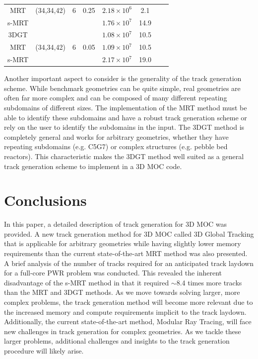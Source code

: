 \begin{table}[h]
\begin{tabular}{cccccccc}
		MRT   & (34,34,42) & 6  & 0.25 & $2.18 \times 10^{6}$ & 2.1 \\
		s-MRT &            &    &      & $1.76 \times 10^{7}$ & 14.9 \\ \hline
		3DGT  &            &    &      & $1.08 \times 10^{7}$ & 10.5 \\
		MRT   & (34,34,42) & 6  & 0.05 & $1.09 \times 10^{7}$ & 10.5 \\
		s-MRT &            &    &      & $2.17 \times 10^{7}$ & 19.0 \\
		\bottomrule
	\end{tabular}
	\label{tab:dom_dec_reqs}
\end{table}

Another important aspect to consider is the generality of the track generation scheme. While benchmark geometries can be quite simple, real geometries are often far more complex and can be composed of many different repeating subdomains of different sizes. The implementation of the MRT method must be able to identify these subdomains and have a robust track generation scheme or rely on the user to identify the subdomains in the input. The 3DGT method is completely general and works for arbitrary geometries, whether they have repeating subdomains (e.g. C5G7) or complex structures (e.g. pebble bed reactors). This characteristic makes the 3DGT method well suited as a general track generation scheme to implement in a 3D MOC code.

\section{Conclusions}

In this paper, a detailed description of track generation for 3D MOC was provided. A new track generation method for 3D MOC called 3D Global Tracking that is applicable for arbitrary geometries while having slightly lower memory requirements than the current state-of-the-art MRT method was also presented. A brief analysis of the number of tracks required for an anticipated track laydown for a full-core PWR problem was conducted. This revealed the inherent disadvantage of the s-MRT method in that it required $\sim$8.4 times more tracks than the MRT and 3DGT methods. As we move towards solving larger, more complex problems, the track generation method will become more relevant due to the increased memory and compute requirements implicit to the track laydown. Additionally, the current state-of-the-art method, Modular Ray Tracing, will face new challenges in track generation for complex geometries. As we tackle these larger problems, additional challenges and insights to the track generation procedure will likely arise.

